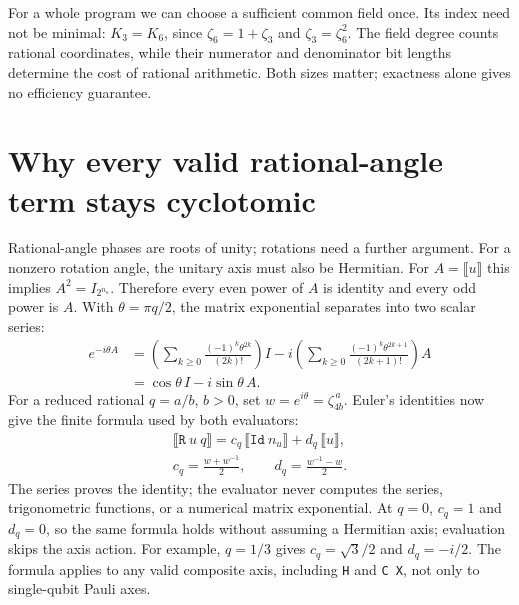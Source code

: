 \documentclass[11pt,a4paper]{article}
\newcommand{\sem}[1]{\llbracket #1\rrbracket}
\newcommand{\code}[1]{\texttt{#1}}
\begin{document}
For a whole program we can choose a sufficient common field once.
Its index need not be minimal: $K_3=K_6$, since
$\zeta_6=1+\zeta_3$ and $\zeta_3=\zeta_6^2$.
The field degree counts rational coordinates, while their numerator
and denominator bit lengths determine the cost of rational arithmetic.
Both sizes matter; exactness alone gives no efficiency guarantee.

\section{Why every valid rational-angle term stays cyclotomic}
\label{sec:closure}
Rational-angle phases are roots of unity; rotations need a further argument.
For a nonzero rotation angle, the unitary axis must also be Hermitian.
For $A=\sem u$ this implies $A^2=I_{2^{n_u}}$. Therefore every even power
of $A$ is identity and every odd power is $A$. With $\theta=\pi q/2$,
the matrix exponential separates into two scalar series:
\begin{equation}
\begin{aligned}
e^{-i\theta A}
&=\left(\sum_{k\ge0}\frac{(-1)^k\theta^{2k}}{(2k)!}\right)I
 -i\left(\sum_{k\ge0}\frac{(-1)^k\theta^{2k+1}}{(2k+1)!}\right)A\\
&=\cos\theta\,I-i\sin\theta\,A.
\end{aligned}
\label{eq:exp}
\end{equation}
For a reduced rational $q=a/b$, $b>0$, set
$w=e^{i\theta}=\zeta_{4b}^{\,a}$. Euler's identities now give the finite
formula used by both evaluators:
\begin{equation}
\begin{gathered}
\sem{\code{R}\ u\ q}
 =c_q\,\sem{\code{Id}\ n_u}+d_q\,\sem u,\\
c_q=\frac{w+w^{-1}}2,\qquad d_q=\frac{w^{-1}-w}2.
\end{gathered}
\label{eq:rotation}
\end{equation}
The series proves the identity; the evaluator never computes the series,
trigonometric functions, or a numerical matrix exponential.
At $q=0$, $c_q=1$ and $d_q=0$, so the same formula holds without
assuming a Hermitian axis; evaluation skips the axis action.
For example, $q=1/3$ gives $c_q=\sqrt3/2$ and $d_q=-i/2$.
The formula applies to any valid composite axis, including \code{H}
and \code{C X}, not only to single-qubit Pauli axes.
\end{document}
